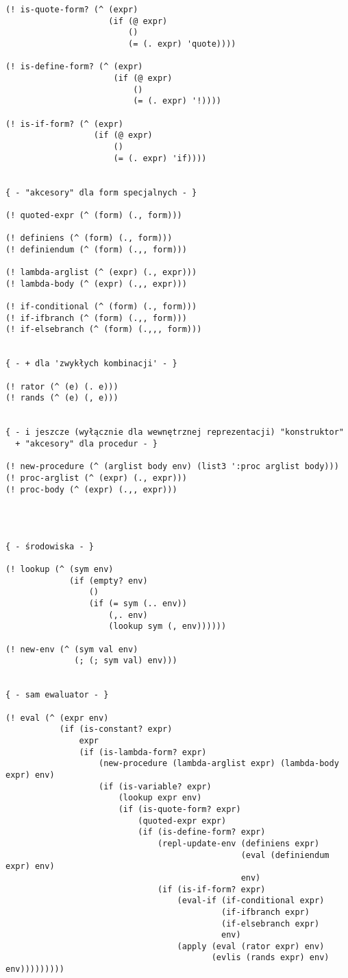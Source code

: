\documentclass[a4paper]{article}
\begin{document}
\begin{verbatim}
(! is-quote-form? (^ (expr)
                     (if (@ expr)
                         ()
                         (= (. expr) 'quote))))

(! is-define-form? (^ (expr)
                      (if (@ expr)
                          ()
                          (= (. expr) '!))))

(! is-if-form? (^ (expr)
                  (if (@ expr)
                      ()
                      (= (. expr) 'if))))


{ - "akcesory" dla form specjalnych - }

(! quoted-expr (^ (form) (., form)))

(! definiens (^ (form) (., form)))
(! definiendum (^ (form) (.,, form)))

(! lambda-arglist (^ (expr) (., expr)))
(! lambda-body (^ (expr) (.,, expr)))

(! if-conditional (^ (form) (., form)))
(! if-ifbranch (^ (form) (.,, form)))
(! if-elsebranch (^ (form) (.,,, form)))


{ - + dla 'zwykłych kombinacji' - }

(! rator (^ (e) (. e)))
(! rands (^ (e) (, e)))


{ - i jeszcze (wyłącznie dla wewnętrznej reprezentacji) "konstruktor"
  + "akcesory" dla procedur - }

(! new-procedure (^ (arglist body env) (list3 ':proc arglist body)))
(! proc-arglist (^ (expr) (., expr)))
(! proc-body (^ (expr) (.,, expr)))




{ - środowiska - }

(! lookup (^ (sym env)
             (if (empty? env)
                 ()
                 (if (= sym (.. env))
                     (,. env)
                     (lookup sym (, env))))))

(! new-env (^ (sym val env)
              (; (; sym val) env)))


{ - sam ewaluator - }

(! eval (^ (expr env)
           (if (is-constant? expr)
               expr
               (if (is-lambda-form? expr)
                   (new-procedure (lambda-arglist expr) (lambda-body expr) env)
                   (if (is-variable? expr)
                       (lookup expr env)
                       (if (is-quote-form? expr)
                           (quoted-expr expr)
                           (if (is-define-form? expr)
                               (repl-update-env (definiens expr)
                                                (eval (definiendum expr) env)
                                                env)
                               (if (is-if-form? expr)
                                   (eval-if (if-conditional expr)
                                            (if-ifbranch expr)
                                            (if-elsebranch expr)
                                            env)
                                   (apply (eval (rator expr) env)
                                          (evlis (rands expr) env) env)))))))))



\end{verbatim}
\end{document}
